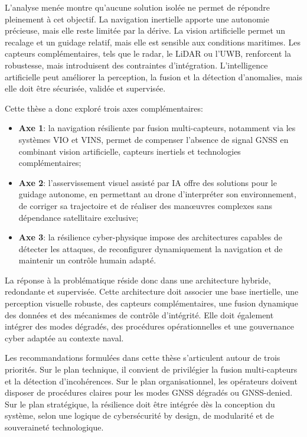 \documentclass[12pt, a4paper, twoside, openright]{report}
\begin{document}
L’analyse menée montre qu’aucune solution isolée ne permet de répondre pleinement à cet objectif. La navigation inertielle apporte une autonomie précieuse, mais elle reste limitée par la dérive. La vision artificielle permet un recalage et un guidage relatif, mais elle est sensible aux conditions maritimes. Les capteurs complémentaires, tels que le radar, le LiDAR ou l’UWB, renforcent la robustesse, mais introduisent des contraintes d’intégration. L’intelligence artificielle peut améliorer la perception, la fusion et la détection d’anomalies, mais elle doit être sécurisée, validée et supervisée.

Cette thèse a donc exploré trois axes complémentaires:
\begin{itemize}
    \item \textbf{Axe 1}: la navigation résiliente par fusion multi-capteurs, notamment via les systèmes VIO et VINS, permet de compenser l’absence de signal GNSS en combinant vision artificielle, capteurs inertiels et technologies complémentaires;
    \item \textbf{Axe 2}: l’asservissement visuel assisté par IA offre des solutions pour le guidage autonome, en permettant au drone d’interpréter son environnement, de corriger sa trajectoire et de réaliser des manœuvres complexes sans dépendance satellitaire exclusive;
    \item \textbf{Axe 3}: la résilience cyber-physique impose des architectures capables de détecter les attaques, de reconfigurer dynamiquement la navigation et de maintenir un contrôle humain adapté.
\end{itemize}

La réponse à la problématique réside donc dans une architecture hybride, redondante et supervisée. Cette architecture doit associer une base inertielle, une perception visuelle robuste, des capteurs complémentaires, une fusion dynamique des données et des mécanismes de contrôle d’intégrité. Elle doit également intégrer des modes dégradés, des procédures opérationnelles et une gouvernance cyber adaptée au contexte naval.

Les recommandations formulées dans cette thèse s’articulent autour de trois priorités. Sur le plan technique, il convient de privilégier la fusion multi-capteurs et la détection d’incohérences. Sur le plan organisationnel, les opérateurs doivent disposer de procédures claires pour les modes GNSS dégradés ou GNSS-denied. Sur le plan stratégique, la résilience doit être intégrée dès la conception du système, selon une logique de cybersécurité by design, de modularité et de souveraineté technologique.
\end{document}
